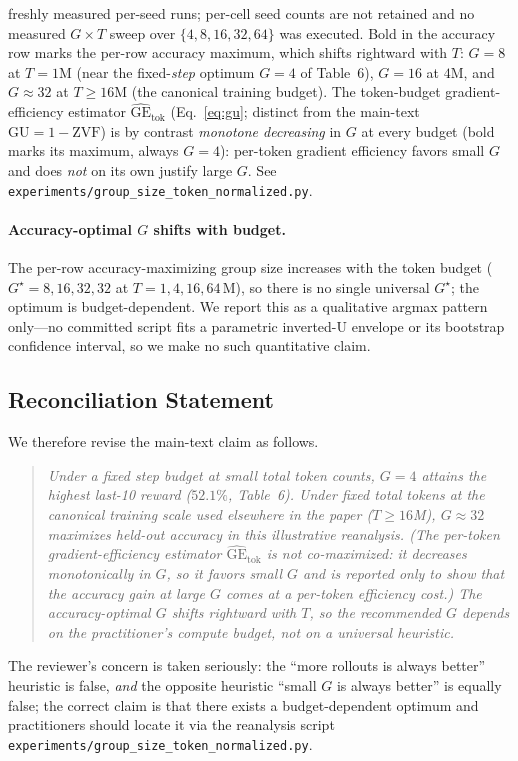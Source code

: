 \begin{table}[ht]
{freshly measured per-seed runs; per-cell seed counts are not retained and no
measured $G\times T$ sweep over $\{4,8,16,32,64\}$ was executed. Bold in the
accuracy row marks the per-row accuracy maximum, which shifts rightward with
$T$: $G{=}8$ at $T{=}1\text{M}$ (near the fixed-\emph{step} optimum $G{=}4$ of
Table~6), $G{=}16$ at $4\text{M}$, and
$G{\approx}32$ at $T{\ge}16\text{M}$ (the canonical training budget). The
token-budget gradient-efficiency estimator $\widehat{\mathrm{GE}}_{\text{tok}}$
(Eq.~\ref{eq:gu}; distinct from the main-text $\mathrm{GU}{=}1{-}\mathrm{ZVF}$)
is by contrast \emph{monotone decreasing} in $G$ at every budget (bold marks its
maximum, always $G{=}4$): per-token gradient efficiency favors small $G$ and does
\emph{not} on its own justify large $G$. See
\texttt{experiments/group\_size\_token\_normalized.py}.}
\label{tab:groupsize-tokennorm}
\end{table}

\paragraph{Accuracy-optimal $G$ shifts with budget.}
The per-row accuracy-maximizing group size increases with the token budget
($G^\star = 8, 16, 32, 32$ at $T = 1, 4, 16, 64\,\text{M}$), so there is no
single universal $G^\star$; the optimum is budget-dependent. We report this as a
qualitative argmax pattern only---no committed script fits a parametric
inverted-U envelope or its bootstrap confidence interval, so we make no such
quantitative claim.

\subsection{Reconciliation Statement}

We therefore revise the main-text claim as follows.
\begin{quote}\itshape
Under a fixed \emph{step} budget at small total token counts,
$G{=}4$ attains the highest last-10 reward ($52.1\%$, Table~6).
Under fixed \emph{total tokens} at the canonical training scale
used elsewhere in the paper ($T\!\ge\!16$M), $G{\approx}32$
maximizes held-out accuracy in this illustrative reanalysis. (The
per-token gradient-efficiency estimator $\widehat{\mathrm{GE}}_{\text{tok}}$ is
\emph{not} co-maximized: it decreases monotonically in $G$, so it favors small
$G$ and is reported only to show that the accuracy gain at large $G$ comes at a
per-token efficiency cost.) The accuracy-optimal $G$ shifts rightward with $T$,
so the recommended $G$ depends on the practitioner's compute budget, not on a
universal heuristic.
\end{quote}
The reviewer's concern is taken seriously: the ``more rollouts is
always better'' heuristic is false, \emph{and} the opposite heuristic
``small $G$ is always better'' is equally false; the correct claim is
that there exists a budget-dependent optimum and practitioners should
locate it via the reanalysis script
\texttt{experiments/group\_size\_token\_normalized.py}.

